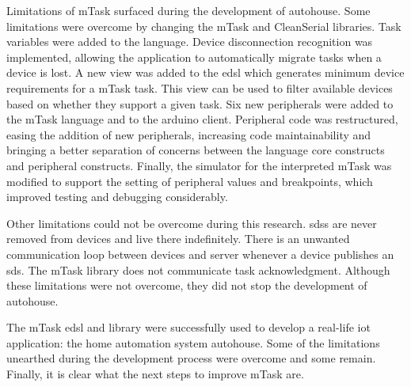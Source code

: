 Limitations of \gls{mTask} surfaced during the development of \gls{autohouse}. Some limitations were overcome by changing the \gls{mTask} and CleanSerial libraries. Task variables were added to the language. Device disconnection recognition was implemented, allowing the application to automatically migrate tasks when a device is lost. A new view was added to the \ac{edsl} which generates minimum device requirements for a \gls{mTask} task. This view can be used to filter available devices based on whether they support a given task. Six new peripherals were added to the \gls{mTask} language and to the \gls{arduino} client. Peripheral code was restructured, easing the addition of new peripherals, increasing code maintainability and bringing a better separation of concerns between the language core constructs and peripheral constructs. Finally, the simulator for the interpreted \gls{mTask} was modified to support the setting of peripheral values and breakpoints, which improved testing and debugging considerably.

Other limitations could not be overcome during this research. \acsp{sds} are never removed from devices and live there indefinitely. There is an unwanted communication loop between devices and server whenever a device publishes an \acs{sds}. The \gls{mTask} library does not communicate task acknowledgment. Although these limitations were not overcome, they did not stop the development of \gls{autohouse}. 

The \gls{mTask} \acs{edsl} and library were successfully used to develop a real-life \acs{iot} application: the home automation system \gls{autohouse}. Some of the limitations unearthed during the development process were overcome and some remain. Finally, it is clear what the next steps to improve \gls{mTask} are.